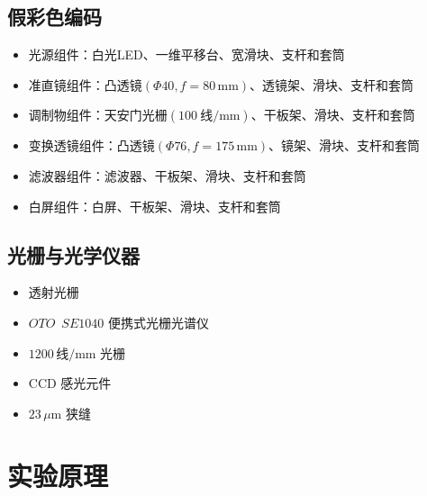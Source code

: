 \documentclass[UTF-8,twoside,cs4size]{ctexart}
\begin{document}
\subsection{假彩色编码}
\begin{itemize}
    \item 光源组件：白光LED、一维平移台、宽滑块、支杆和套筒
    \item 准直镜组件：凸透镜\(\left( \varPhi 40, f = 80\,\text{mm} \right)\)、透镜架、滑块、支杆和套筒
    \item 调制物组件：天安门光栅\(\left( 100\ \text{线}/\text{mm} \right)\)、干板架、滑块、支杆和套筒
    \item 变换透镜组件：凸透镜\(\left( \varPhi 76, f = 175\,\text{mm} \right)\)、镜架、滑块、支杆和套筒
    \item 滤波器组件：滤波器、干板架、滑块、支杆和套筒
    \item 白屏组件：白屏、干板架、滑块、支杆和套筒
\end{itemize}

\subsection{光栅与光学仪器}
\begin{itemize}
    \item 透射光栅
    \item \(OTO \enspace SE1040\) 便携式光栅光谱仪
    \item \(1200\,\text{线}/\text{mm}\) 光栅
    \item CCD 感光元件
    \item \(23\,\mu\text{m}\) 狭缝
\end{itemize}

\section{实验原理}
\end{document}
